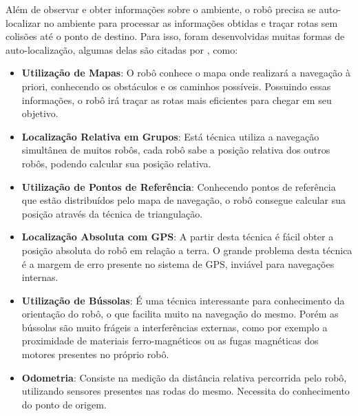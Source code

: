 	Além de observar e obter informações sobre o ambiente, o robô precisa se auto-localizar no ambiente para processar as informações obtidas e traçar rotas sem colisões até o ponto de destino. Para isso, foram desenvolvidas muitas formas de auto-localização, algumas delas são citadas por \cite{roboBulldozerIV}, como:

	\begin{itemize}
		\item \textbf{Utilização de Mapas}: O robô conhece o mapa onde realizará a navegação à priori, conhecendo os obstáculos e os caminhos possíveis. Possuindo essas informações, o robô irá traçar as rotas mais eficientes para chegar em seu objetivo.

		\item \textbf{Localização Relativa em Grupos}: Está técnica utiliza a navegação simultânea de muitos robôs, cada robô sabe a posição relativa dos outros robôs, podendo calcular sua posição relativa.

		\item \textbf{Utilização de Pontos de Referência}: Conhecendo pontos de referência que estão distribuídos pelo mapa de navegação, o robô consegue calcular sua posição através da técnica de triangulação.

		\item \textbf{Localização Absoluta com GPS}: A partir desta técnica é fácil obter a posição absoluta do robô em relação a terra. O grande problema desta técnica é a margem de erro presente no sistema de GPS, inviável para navegações internas.

		\item \textbf{Utilização de Bússolas}: É uma técnica interessante para conhecimento da orientação do robô, o que facilita muito na navegação do mesmo. Porém as bússolas são muito frágeis a interferências externas, como por exemplo a proximidade de materiais ferro-magnéticos ou as fugas magnéticas dos motores presentes no próprio robô.

		\item \textbf{Odometria}: Consiste na medição da distância relativa percorrida pelo robô, utilizando sensores presentes nas rodas do mesmo. Necessita do conhecimento do ponto de origem.
		 
	\end{itemize}